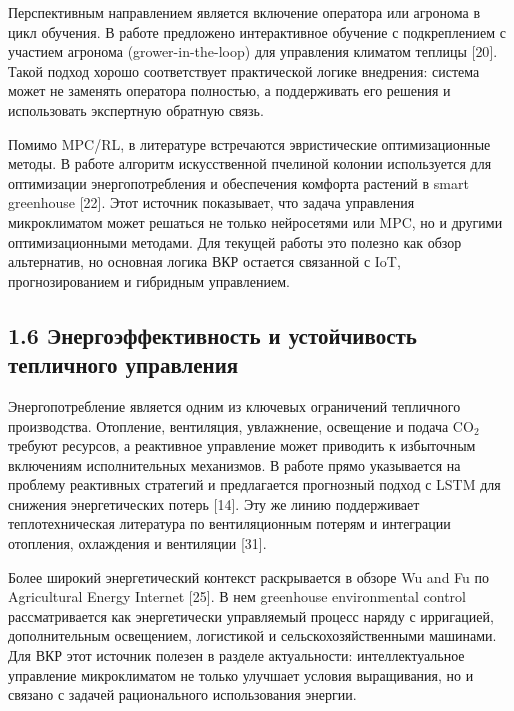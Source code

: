 \documentclass[a4paper,14pt]{extarticle}
\begin{document}
Перспективным направлением является включение оператора или агронома в
цикл обучения. В работе предложено интерактивное обучение с
подкреплением с участием агронома (grower-in-the-loop) для управления
климатом теплицы {[}20{]}. Такой подход хорошо соответствует
практической логике внедрения: система может не заменять оператора
полностью, а поддерживать его решения и использовать экспертную обратную
связь.

Помимо MPC/RL, в литературе встречаются эвристические оптимизационные
методы. В работе алгоритм искусственной пчелиной колонии используется
для оптимизации энергопотребления и обеспечения комфорта растений в
smart greenhouse {[}22{]}. Этот источник показывает, что задача
управления микроклиматом может решаться не только нейросетями или MPC,
но и другими оптимизационными методами. Для текущей работы это полезно
как обзор альтернатив, но основная логика ВКР остается связанной с IoT,
прогнозированием и гибридным управлением.

\hypertarget{ux44dux43dux435ux440ux433ux43eux44dux444ux444ux435ux43aux442ux438ux432ux43dux43eux441ux442ux44c-ux438-ux443ux441ux442ux43eux439ux447ux438ux432ux43eux441ux442ux44c-ux442ux435ux43fux43bux438ux447ux43dux43eux433ux43e-ux443ux43fux440ux430ux432ux43bux435ux43dux438ux44f}{%
\subsection{1.6 Энергоэффективность и устойчивость тепличного
управления}\label{ux44dux43dux435ux440ux433ux43eux44dux444ux444ux435ux43aux442ux438ux432ux43dux43eux441ux442ux44c-ux438-ux443ux441ux442ux43eux439ux447ux438ux432ux43eux441ux442ux44c-ux442ux435ux43fux43bux438ux447ux43dux43eux433ux43e-ux443ux43fux440ux430ux432ux43bux435ux43dux438ux44f}}

Энергопотребление является одним из ключевых ограничений тепличного
производства. Отопление, вентиляция, увлажнение, освещение и подача
CO\(_2\) требуют ресурсов, а реактивное управление может приводить к
избыточным включениям исполнительных механизмов. В работе прямо
указывается на проблему реактивных стратегий и предлагается прогнозный
подход с LSTM для снижения энергетических потерь {[}14{]}. Эту же линию
поддерживает теплотехническая литература по вентиляционным потерям и
интеграции отопления, охлаждения и вентиляции {[}31{]}.

Более широкий энергетический контекст раскрывается в обзоре Wu and Fu по
Agricultural Energy Internet {[}25{]}. В нем greenhouse environmental
control рассматривается как энергетически управляемый процесс наряду с
ирригацией, дополнительным освещением, логистикой и
сельскохозяйственными машинами. Для ВКР этот источник полезен в разделе
актуальности: интеллектуальное управление микроклиматом не только
улучшает условия выращивания, но и связано с задачей рационального
использования энергии.
\end{document}
